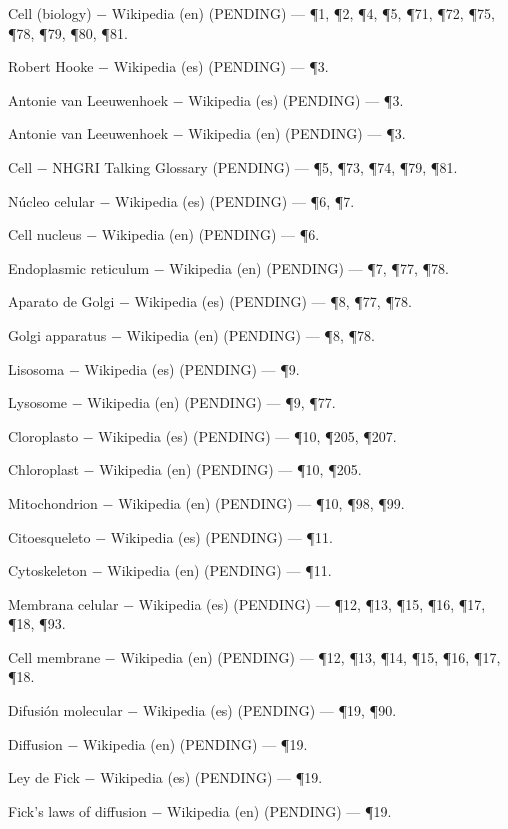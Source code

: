 \documentclass{book}
\begin{document}
\noindent Cell (biology) \(-\) Wikipedia (en) (PENDING) --- \P1, \P2, \P4, \P5, \P71, \P72, \P75, \P78, \P79, \P80, \P81.

\noindent Robert Hooke \(-\) Wikipedia (es) (PENDING) --- \P3.

\noindent Antonie van Leeuwenhoek \(-\) Wikipedia (es) (PENDING) --- \P3.

\noindent Antonie van Leeuwenhoek \(-\) Wikipedia (en) (PENDING) --- \P3.

\noindent Cell \(-\) NHGRI Talking Glossary (PENDING) --- \P5, \P73, \P74, \P79, \P81.

\noindent Núcleo celular \(-\) Wikipedia (es) (PENDING) --- \P6, \P7.

\noindent Cell nucleus \(-\) Wikipedia (en) (PENDING) --- \P6.

\noindent Endoplasmic reticulum \(-\) Wikipedia (en) (PENDING) --- \P7, \P77, \P78.

\noindent Aparato de Golgi \(-\) Wikipedia (es) (PENDING) --- \P8, \P77, \P78.

\noindent Golgi apparatus \(-\) Wikipedia (en) (PENDING) --- \P8, \P78.

\noindent Lisosoma \(-\) Wikipedia (es) (PENDING) --- \P9.

\noindent Lysosome \(-\) Wikipedia (en) (PENDING) --- \P9, \P77.

\noindent Cloroplasto \(-\) Wikipedia (es) (PENDING) --- \P10, \P205, \P207.

\noindent Chloroplast \(-\) Wikipedia (en) (PENDING) --- \P10, \P205.

\noindent Mitochondrion \(-\) Wikipedia (en) (PENDING) --- \P10, \P98, \P99.

\noindent Citoesqueleto \(-\) Wikipedia (es) (PENDING) --- \P11.

\noindent Cytoskeleton \(-\) Wikipedia (en) (PENDING) --- \P11.

\noindent Membrana celular \(-\) Wikipedia (es) (PENDING) --- \P12, \P13, \P15, \P16, \P17, \P18, \P93.

\noindent Cell membrane \(-\) Wikipedia (en) (PENDING) --- \P12, \P13, \P14, \P15, \P16, \P17, \P18.

\noindent Difusión molecular \(-\) Wikipedia (es) (PENDING) --- \P19, \P90.

\noindent Diffusion \(-\) Wikipedia (en) (PENDING) --- \P19.

\noindent Ley de Fick \(-\) Wikipedia (es) (PENDING) --- \P19.

\noindent Fick's laws of diffusion \(-\) Wikipedia (en) (PENDING) --- \P19.
\end{document}
